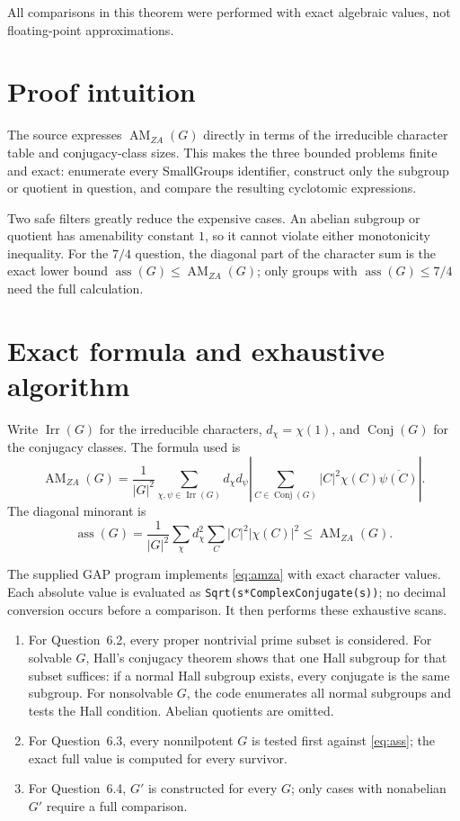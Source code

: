 \documentclass[11pt]{article}
\newcommand{\AM}{\operatorname{AM}_{ZA}}
\newcommand{\ass}{\operatorname{ass}}
\begin{document}
All comparisons in this theorem were performed with exact algebraic values,
not floating-point approximations.

\section{Proof intuition}

The source expresses $\AM(G)$ directly in terms of the irreducible character
table and conjugacy-class sizes.  This makes the three bounded problems finite
and exact: enumerate every SmallGroups identifier, construct only the subgroup
or quotient in question, and compare the resulting cyclotomic expressions.

Two safe filters greatly reduce the expensive cases.  An abelian subgroup or
quotient has amenability constant $1$, so it cannot violate either monotonicity
inequality.  For the $7/4$ question, the diagonal part of the character sum is
the exact lower bound $\ass(G)\leq\AM(G)$; only groups with
$\ass(G)\leq7/4$ need the full calculation.

\section{Exact formula and exhaustive algorithm}

Write $\operatorname{Irr}(G)$ for the irreducible characters, $d_\chi=\chi(1)$,
and $\operatorname{Conj}(G)$ for the conjugacy classes.  The formula used is
\begin{equation}
\label{eq:amza}
 \AM(G)=\frac1{|G|^2}
 \sum_{\chi,\psi\in\operatorname{Irr}(G)}d_\chi d_\psi
 \left|\sum_{C\in\operatorname{Conj}(G)}
 |C|^2\chi(C)\overline{\psi(C)}\right|.
\end{equation}
The diagonal minorant is
\begin{equation}
\label{eq:ass}
 \ass(G)=\frac1{|G|^2}\sum_{\chi}d_\chi^2
 \sum_C |C|^2|\chi(C)|^2\leq\AM(G).
\end{equation}

The supplied GAP program implements \eqref{eq:amza} with exact character
values.  Each absolute value is evaluated as
\texttt{Sqrt(s*ComplexConjugate(s))}; no decimal conversion occurs before a
comparison.  It then performs these exhaustive scans.

\begin{enumerate}
\item For Question~6.2, every proper nontrivial prime subset is considered.
For solvable $G$, Hall's conjugacy theorem \cite{Hall} shows that one Hall
subgroup for that subset suffices: if a normal Hall subgroup exists, every
conjugate is the same subgroup.  For nonsolvable $G$, the code enumerates all
normal subgroups and tests the Hall condition.  Abelian quotients are omitted.
\item For Question~6.3, every nonnilpotent $G$ is tested first against
\eqref{eq:ass}; the exact full value is computed for every survivor.
\item For Question~6.4, $G'$ is constructed for every $G$; only cases with
nonabelian $G'$ require a full comparison.
\end{enumerate}
\end{document}

